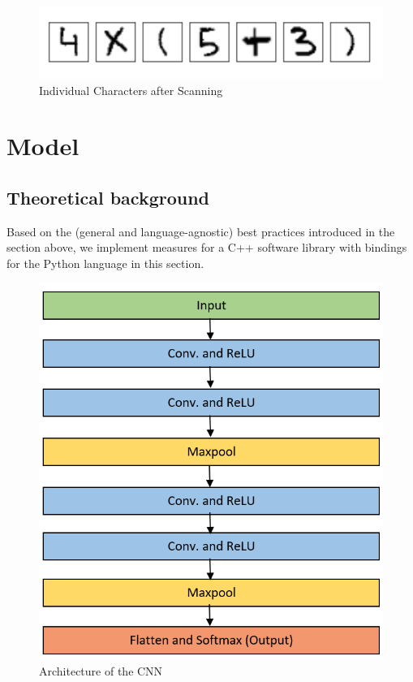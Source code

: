 \documentclass[@CLASSOPTIONS@]{tumarticle}
\begin{document}
\begin{figure}
    \begin{minipage}{0.48\textwidth}
     \centering
     \includegraphics[width=.9\linewidth]{figures/real_data_3}
     \caption{Individual Characters after Scanning}\label{Fig:Data6}
   \end{minipage}
\end{figure}

\section{Model}
\label{sec:implementation}


\subsection{Theoretical background}
Based on the (general and language-agnostic) best practices introduced in
the section above, we implement measures for a C++ software library with
bindings for the Python language in this section.

\begin{figure}
    \begin{minipage}{0.48\textwidth}
     \centering
     \includegraphics[width=.9\linewidth]{figures/CNN_Arch}
     \caption{Architecture of the CNN}\label{Fig:CNN_A}
   \end{minipage}
\end{figure}
\end{document}
